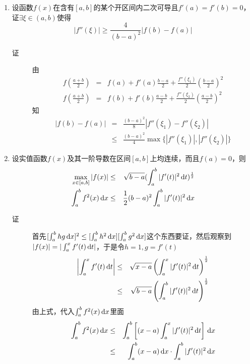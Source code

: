\begin{enumerate}
\item 设函数$f(x)$在含有$[a,b]$的某个开区间内二次可导且$f'(a)=f'(b)=0$，证$\exists \xi \in (a,b)$使得
\[
|f''(\xi)|\geq \frac{4}{(b-a)^2}|f(b)-f(a)|
\]
\begin{description}
\item[证] 由
\begin{eqnarray*}
f\left(\frac{a+b}{2}\right)& = &f(a) + f'(a)\frac{b-a}{2}+\frac{f''(\xi_1)}{2}\left(\frac{b-a}{2}\right)^2\\
f\left(\frac{a+b}{2}\right)& = &f(b) + f'(b)\frac{a-b}{2}+\frac{f''(\xi_2)}{2}\left(\frac{a-b}{2}\right)^2
\end{eqnarray*}
知
\begin{eqnarray*}
|f(b)-f(a)|&=&\frac{(b-a)^2}{8}|f''(\xi_1)-f''(\xi_2)|\\
&\leq&\frac{(b-a)^2}{4}\max\{|f''(\xi_1)|,|f''(\xi_2)|\}
\end{eqnarray*}
\end{description}


\item 设实值函数$f(x)$及其一阶导数在区间$[a,b]$上均连续，而且$f(a)=0$，则
\begin{eqnarray*}
\max_{x\in [a,b]}|f(x)| & \leq & \sqrt{b-a}(\int_a^b|f'(t)|^2 \,\mathrm{d} t)^\frac{1}{2}\\
\int_a^b f^2(x)\,\mathrm{d} x & \leq & \frac{1}{2}(b-a)^2\int_a^b|f'(t)|^2\,\mathrm{d} x
\end{eqnarray*}
\begin{description}
\item[证] 首先$[\int_a^bhg\,\mathrm{d} x]^2\leq [\int_a^bh^2\,\mathrm{d} x][\int_a^bg^2\,\mathrm{d} x]$这个东西要证，然后观察到$|f(x)|=|\int_a^xf'(t)\,\mathrm{d} t|$，于是令$h=1,g=f'(t)$
\begin{eqnarray*}
\left|\int_a^xf'(t)\,\mathrm{d} t\right| &\leq &\sqrt{x-a}\left(\int_a^x|f'(t)|^2\,\mathrm{d} t\right)^\frac{1}{2}\\
&\leq &\sqrt{b-a}\left(\int_a^b|f'(t)|^2\,\mathrm{d} t\right)^\frac{1}{2}
\end{eqnarray*}
由上式，代入$\int_a^b f^2(x)\,\mathrm{d} x$里面
\begin{eqnarray*}
\int_a^b f^2(x)\,\mathrm{d} x &\leq & \int_a^b \left[(x-a)\int_a^x|f'(t)|^2\,\mathrm{d} t \right]\,\mathrm{d} x\\
&\leq & \int_a^b (x-a)\,\mathrm{d} x \cdot \int_a^b|f'(t)|^2\,\mathrm{d} x\\
\end{eqnarray*}
\end{description}



\end{enumerate}
